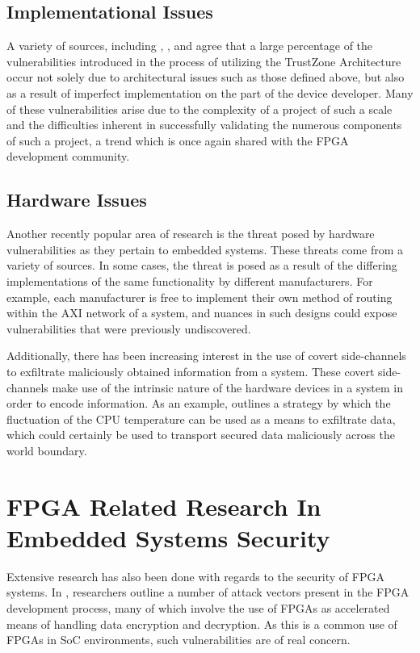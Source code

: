 \documentclass[journal]{IEEEtran}
\begin{document}
\subsection{Implementational Issues}
A variety of sources, including \cite{cerdeira_sok_nodate}, \cite{benhani_security_2019},
and \cite{benhani_security_2017} agree that a large percentage of the vulnerabilities
introduced in the process of utilizing the TrustZone Architecture occur not solely due to
architectural issues such as those defined above, but also as a result of imperfect
implementation on the part of the device developer. Many of these vulnerabilities arise
due to the complexity of a project of such a scale and the difficulties inherent in
successfully validating the numerous components of such a project, a trend which is once
again shared with the FPGA development community.

\subsection{Hardware Issues}
Another recently popular area of research is the threat posed by hardware vulnerabilities
as they pertain to embedded systems. These threats come from a variety of sources. In some
cases, the threat is posed as a result of the differing implementations of the same
functionality by different manufacturers. For example, each manufacturer is free to 
implement their own method of routing within the AXI network of a system, and nuances in
such designs could expose vulnerabilities that were previously undiscovered.

Additionally, there has been increasing interest in the use of covert side-channels to
exfiltrate maliciously obtained information from a system. These covert side-channels make
use of the intrinsic nature of the hardware devices in a system in order to encode
information. As an example, \cite{masti_thermal_2015} outlines a strategy by which the
fluctuation of the CPU temperature can be used as a means to exfiltrate data, which could
certainly be used to transport secured data maliciously across the world boundary.

\section{FPGA Related Research In Embedded Systems Security}
Extensive research has also been done with regards to the security of FPGA systems. In
\cite{badrignans_security_2011}, researchers outline a number of attack vectors present in
the FPGA development process, many of which involve the use of FPGAs as accelerated means
of handling data encryption and decryption. As this is a common use of FPGAs in SoC
environments, such vulnerabilities are of real concern. 
\end{document}
